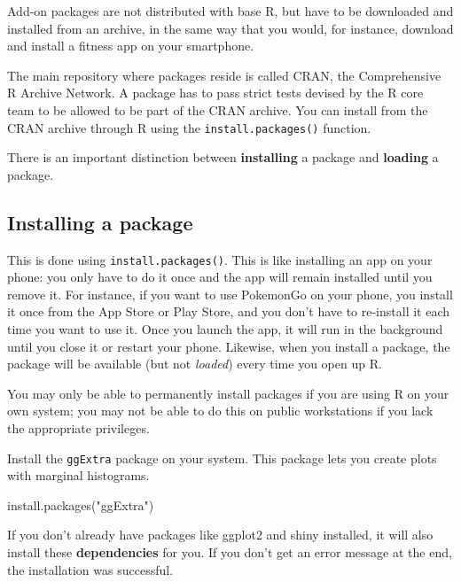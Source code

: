 \documentclass[
  oneside]{book}
\newenvironment{Shaded}{\begin{snugshade}}{\end{snugshade}}
\newcommand{\FunctionTok}[1]{\textcolor[rgb]{0.00,0.00,0.00}{#1}}
\newcommand{\NormalTok}[1]{#1}
\newcommand{\StringTok}[1]{\textcolor[rgb]{0.31,0.60,0.02}{#1}}
\begin{document}
Add-on packages are not distributed with base R, but have to be downloaded and installed from an archive, in the same way that you would, for instance, download and install a fitness app on your smartphone.

The main repository where packages reside is called CRAN, the Comprehensive R Archive Network. A package has to pass strict tests devised by the R core team to be allowed to be part of the CRAN archive. You can install from the CRAN archive through R using the \texttt{install.packages()} function.

There is an important distinction between \textbf{installing} a package and \textbf{loading} a package.

\hypertarget{installing-a-package}{%
\subsection{Installing a package}\label{installing-a-package}}

This is done using \texttt{install.packages()}. This is like installing an app on your phone: you only have to do it once and the app will remain installed until you remove it. For instance, if you want to use PokemonGo on your phone, you install it once from the App Store or Play Store, and you don't have to re-install it each time you want to use it. Once you launch the app, it will run in the background until you close it or restart your phone. Likewise, when you install a package, the package will be available (but not \emph{loaded}) every time you open up R.

\begin{warning}
You may only be able to permanently install packages if you are using R on your own system; you may not be able to do this on public workstations if you lack the appropriate privileges.

\end{warning}

Install the \texttt{ggExtra} package on your system. This package lets you create plots with marginal histograms.

\begin{Shaded}
\begin{Highlighting}[]
\FunctionTok{install.packages}\NormalTok{(}\StringTok{"ggExtra"}\NormalTok{)}
\end{Highlighting}
\end{Shaded}

If you don't already have packages like ggplot2 and shiny installed, it will also install these \textbf{dependencies} for you. If you don't get an error message at the end, the installation was successful.
\end{document}
